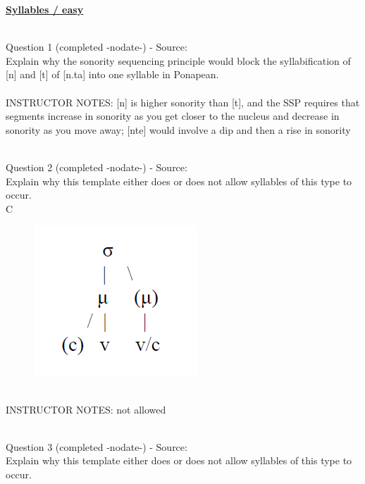 \documentclass[12pt]{article}
\begin{document}
\newpage\textbf{\underline{\huge Syllables / easy\\}}

~\\

{\large Question 1} (completed -nodate-) - Source: \\

Explain why the sonority sequencing principle would block the syllabification of [n] and [t] of [n.ta] into one syllable in Ponapean.\\


~\\
INSTRUCTOR NOTES: [n] is higher sonority than [t], and the SSP requires that segments increase in sonority as you get closer to the nucleus and decrease in sonority as you move away; [nte] would involve a dip and then a rise in sonority


~\\

{\large Question 2} (completed -nodate-) - Source: \\

Explain why this template either does or does not allow syllables of this type to occur.\\

C

\begin{figure}[H]
\includegraphics{../images/ponapean_syllabletemplate.png}
\end{figure}

~\\
INSTRUCTOR NOTES: not allowed


~\\

{\large Question 3} (completed -nodate-) - Source: \\

Explain why this template either does or does not allow syllables of this type to occur.\\
\end{document}
